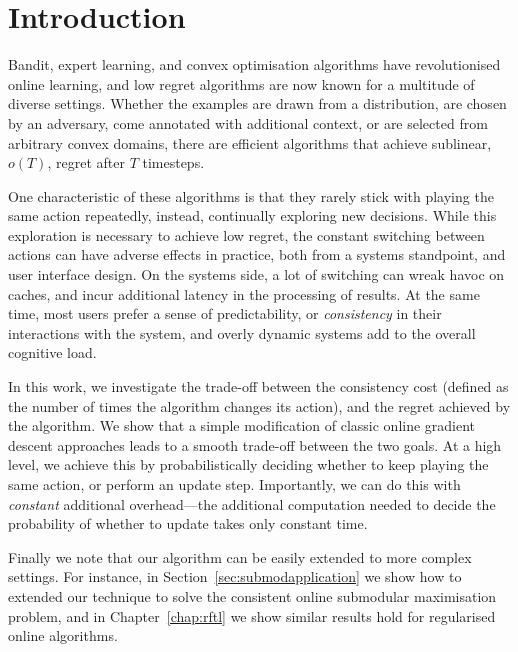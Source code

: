 \chapter{Introduction}
Bandit, expert learning, and convex optimisation algorithms have revolutionised online learning, and low regret algorithms are now known for a multitude of diverse settings. Whether the examples are drawn from a distribution, are chosen by an adversary,  come annotated with additional context, or are selected from arbitrary convex domains, there are efficient algorithms that achieve sublinear, $o(T)$, regret after $T$ timesteps. 

One characteristic of these algorithms is that they rarely stick with playing the same action repeatedly, instead, continually exploring new decisions. While this exploration is necessary to achieve low regret, the constant switching between actions can have adverse effects in practice, both from a systems standpoint, and user interface design.  On the systems side,  a lot of switching can wreak havoc on caches, and incur additional latency in the processing of results.  At the same time, most users prefer a sense of predictability, or {\em consistency} in their interactions with the system, and overly dynamic systems add to the overall cognitive load.  

In this work, we investigate the trade-off between the consistency cost (defined as the number of times the algorithm changes its action), and the regret achieved by the algorithm. We show that a simple modification of classic online gradient descent approaches leads to a smooth trade-off between the two goals. At a high level, we achieve this by probabilistically deciding whether to keep playing the same action, or perform an update step. Importantly, we can do this with \emph{constant} additional overhead---the additional computation needed to decide the probability of whether to update takes only constant time. 

Finally we note that our algorithm can be easily extended to more complex settings. For instance, in Section~\ref{sec:submodapplication} we show how to extended our technique to solve the consistent online submodular maximisation problem, and in Chapter~\ref{chap:rftl} we show similar results hold for regularised online algorithms.

